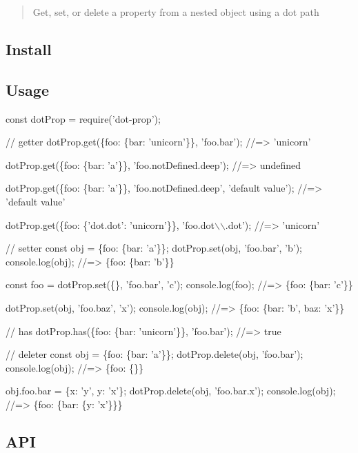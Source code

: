 \begin{quote}
Get, set, or delete a property from a nested object using a dot path \end{quote}


\subsection*{Install}




\subsection*{Usage}


\begin{DoxyCode}
const dotProp = require('dot-prop');

// getter
dotProp.get(\{foo: \{bar: 'unicorn'\}\}, 'foo.bar');
//=> 'unicorn'

dotProp.get(\{foo: \{bar: 'a'\}\}, 'foo.notDefined.deep');
//=> undefined

dotProp.get(\{foo: \{bar: 'a'\}\}, 'foo.notDefined.deep', 'default value');
//=> 'default value'

dotProp.get(\{foo: \{'dot.dot': 'unicorn'\}\}, 'foo.dot\(\backslash\)\(\backslash\).dot');
//=> 'unicorn'

// setter
const obj = \{foo: \{bar: 'a'\}\};
dotProp.set(obj, 'foo.bar', 'b');
console.log(obj);
//=> \{foo: \{bar: 'b'\}\}

const foo = dotProp.set(\{\}, 'foo.bar', 'c');
console.log(foo);
//=> \{foo: \{bar: 'c'\}\}

dotProp.set(obj, 'foo.baz', 'x');
console.log(obj);
//=> \{foo: \{bar: 'b', baz: 'x'\}\}

// has
dotProp.has(\{foo: \{bar: 'unicorn'\}\}, 'foo.bar');
//=> true

// deleter
const obj = \{foo: \{bar: 'a'\}\};
dotProp.delete(obj, 'foo.bar');
console.log(obj);
//=> \{foo: \{\}\}

obj.foo.bar = \{x: 'y', y: 'x'\};
dotProp.delete(obj, 'foo.bar.x');
console.log(obj);
//=> \{foo: \{bar: \{y: 'x'\}\}\}
\end{DoxyCode}


\subsection*{A\+PI}

